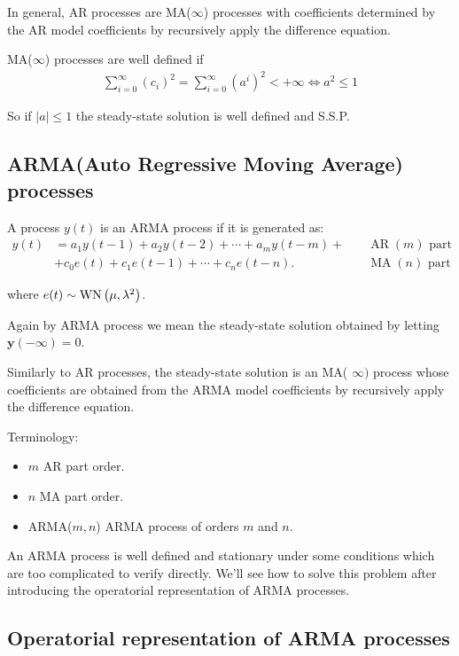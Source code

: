 In general, AR processes are MA($\infty$) processes with coefficients determined by the AR model coefficients by recursively apply the difference equation.

MA($\infty$) processes are well defined if 
\begin{align*}
	\sum_{i=0}^{\infty} \left(c_{i}\right)^2=\sum_{i=0}^{\infty} \left(a^{i}\right)^2< +\infty \iff a^2\leq 1
\end{align*}

So if $|a|\leq1$ the steady-state solution is well defined and S.S.P.

\subsection{ARMA(Auto Regressive Moving Average) processes}

A process $y(t)$ is an ARMA process if it is generated as:
\begin{align*}
	y(t)&=a_{1} y(t-1)+a_{2} y(t-2)+\cdots+a_{m} y(t-m)+\quad &\operatorname{AR}(m) \text{ part}\\ &+c_{0} e(t)+c_{1} e(t-1)+\cdots+c_{n} e(t-n) . \quad &\operatorname{MA}(n) \text{ part}
\end{align*}

where $e(t) \sim \operatorname{WN}\left(\mu, \lambda^{2}\right)$.

Again by ARMA process we mean the steady-state solution obtained by letting $\mathbf{y}(-\infty)=0$.
 
Similarly to AR processes, the steady-state solution is an MA( $\infty)$ process whose coefficients are obtained from the ARMA model coefficients by recursively apply the difference equation.
 
Terminology:
\begin{itemize}
	\item $m$ AR part order.
	\item $n$ MA part order.
	\item ARMA($m,n$) ARMA process of orders $m$ and $n$.
\end{itemize}

An ARMA process is well defined and stationary under some conditions which are too complicated to verify directly.
We'll see how to solve this problem after introducing the operatorial 
representation of ARMA processes.

\subsection{Operatorial representation of ARMA processes}


